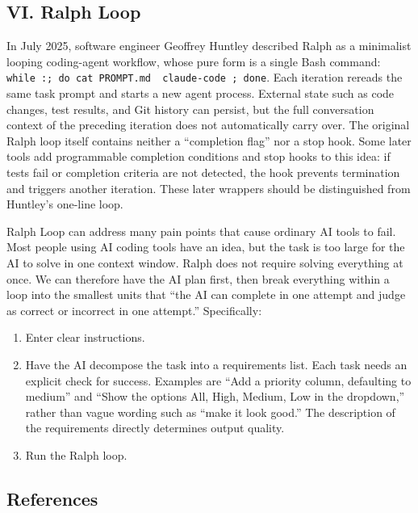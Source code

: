 \hypertarget{vi.-ralph-loop}{%
\subsection{VI. Ralph Loop}\label{vi.-ralph-loop}}

In July 2025, software engineer Geoffrey Huntley described Ralph as a minimalist looping coding-agent workflow, whose pure form is a single Bash command: \texttt{while\ :;\ do\ cat\ PROMPT.md\ \textbar{}\ claude-code\ ;\ done}. Each iteration rereads the same task prompt and starts a new agent process. External state such as code changes, test results, and Git history can persist, but the full conversation context of the preceding iteration does not automatically carry over. The original Ralph loop itself contains neither a ``completion flag'' nor a stop hook. Some later tools add programmable completion conditions and stop hooks to this idea: if tests fail or completion criteria are not detected, the hook prevents termination and triggers another iteration. These later wrappers should be distinguished from Huntley's one-line loop.

Ralph Loop can address many pain points that cause ordinary AI tools to fail. Most people using AI coding tools have an idea, but the task is too large for the AI to solve in one context window. Ralph does not require solving everything at once. We can therefore have the AI plan first, then break everything within a loop into the smallest units that ``the AI can complete in one attempt and judge as correct or incorrect in one attempt.'' Specifically:

\begin{enumerate}
\def\labelenumi{\arabic{enumi}.}
\item
  Enter clear instructions.
\item
  Have the AI decompose the task into a requirements list. Each task needs an explicit check for success. Examples are ``Add a priority column, defaulting to medium'' and ``Show the options All, High, Medium, Low in the dropdown,'' rather than vague wording such as ``make it look good.'' The description of the requirements directly determines output quality.
\item
  Run the Ralph loop.
\end{enumerate}

\FloatBarrier
{}
\hypertarget{references-114}{%
\subsection{References}\label{references-114}}

